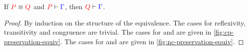 \begin{lemma}\label{thm:nc-preservation-equiv}
  If $\tm{P} \equiv \tm{Q}$ and $\seq[{ P }]{ \Gamma }$, then $\seq[{ Q }]{ \Gamma }$.
\end{lemma}
\begin{proof}
  By induction on the structure of the equivalence. The cases for reflexivity,
  transitivity and congruence are trivial. The cases for \cpEquivCutComm and
   are given in \cref{fig:cp-preservation-equiv}.
  The cases for \ncEquivPoolComm and  are given in
  \cref{fig:nc-preservation-equiv}.
\end{proof}
